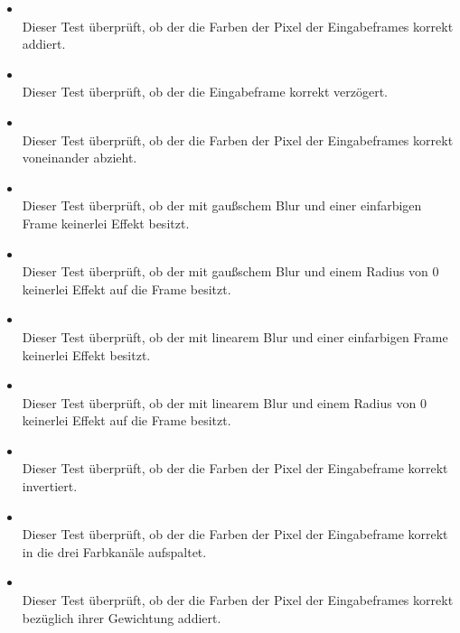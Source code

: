 \begin{itemize}

\item{}~\\
Dieser Test überprüft, ob der  die Farben der Pixel der Eingabeframes korrekt addiert.

\item{}~\\
Dieser Test überprüft, ob der  die Eingabeframe korrekt verzögert.

\item{}~\\
Dieser Test überprüft, ob der  die Farben der Pixel der Eingabeframes korrekt voneinander abzieht.

\item{}~\\
Dieser Test überprüft, ob der  mit gaußschem Blur und einer einfarbigen Frame keinerlei Effekt besitzt.

\item{}~\\
Dieser Test überprüft, ob der  mit gaußschem Blur und einem Radius von 0 keinerlei Effekt auf die Frame besitzt.

\item{}~\\
Dieser Test überprüft, ob der  mit linearem Blur und einer einfarbigen Frame keinerlei Effekt besitzt.

\item{}~\\
Dieser Test überprüft, ob der  mit linearem Blur und einem Radius von 0 keinerlei Effekt auf die Frame besitzt.

\item{}~\\
Dieser Test überprüft, ob der  die Farben der Pixel der Eingabeframe korrekt invertiert.

\item{}~\\
Dieser Test überprüft, ob der  die Farben der Pixel der Eingabeframe korrekt in die drei Farbkanäle aufspaltet.

\item{}~\\
Dieser Test überprüft, ob der  die Farben der Pixel der Eingabeframes korrekt bezüglich ihrer Gewichtung addiert.

\end{itemize}


